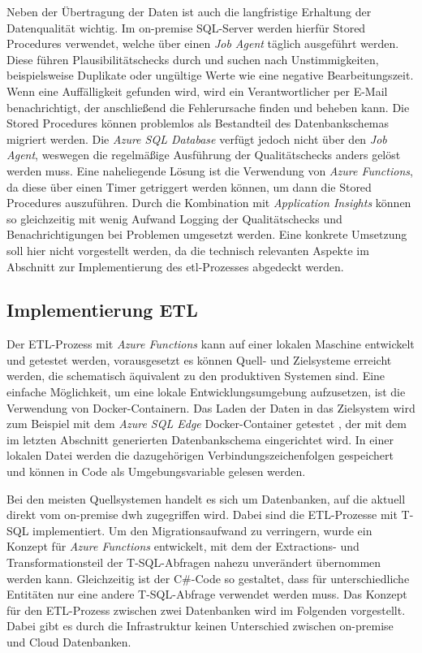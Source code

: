 Neben der Übertragung der Daten ist auch die langfristige Erhaltung der Datenqualität wichtig. Im on-premise SQL-Server werden hierfür Stored Procedures verwendet, welche über einen \textit{Job Agent} täglich ausgeführt werden. Diese führen Plausibilitätschecks durch und suchen nach Unstimmigkeiten, beispielsweise Duplikate oder ungültige Werte wie eine negative Bearbeitungszeit. Wenn eine Auffälligkeit gefunden wird, wird ein Verantwortlicher per E-Mail benachrichtigt, der anschließend die Fehlerursache finden und beheben kann. Die Stored Procedures können problemlos als Bestandteil des Datenbankschemas migriert werden. Die \textit{Azure SQL Database} verfügt jedoch nicht über den \textit{Job Agent}, weswegen die regelmäßige Ausführung der Qualitätschecks anders gelöst werden muss. Eine naheliegende Lösung ist die Verwendung von \textit{Azure Functions}, da diese über einen Timer getriggert werden können, um dann die Stored Procedures auszuführen. Durch die Kombination mit \textit{Application Insights} können so gleichzeitig mit wenig Aufwand Logging der Qualitätschecks und Benachrichtigungen bei Problemen umgesetzt werden. Eine konkrete Umsetzung soll hier nicht vorgestellt werden, da die technisch relevanten Aspekte im Abschnitt zur Implementierung des \ac{etl}-Prozesses abgedeckt werden.

\subsection{Implementierung ETL}
Der ETL-Prozess mit \textit{Azure Functions} kann auf einer lokalen Maschine entwickelt und getestet werden, vorausgesetzt es können Quell- und Zielsysteme erreicht werden, die schematisch äquivalent zu den produktiven Systemen sind. Eine einfache Möglichkeit, um eine lokale Entwicklungsumgebung aufzusetzen, ist die Verwendung von Docker-Containern. Das Laden der Daten in das Zielsystem wird zum Beispiel mit dem \textit{Azure SQL Edge} Docker-Container getestet \cite[vgl.][]{msdoc_22_sql_docker}, der mit dem im letzten Abschnitt generierten Datenbankschema eingerichtet wird. In einer lokalen Datei werden die dazugehörigen Verbindungszeichenfolgen gespeichert und können in Code als Umgebungsvariable gelesen werden.

Bei den meisten Quellsystemen handelt es sich um Datenbanken, auf die aktuell direkt vom on-premise \ac{dwh} zugegriffen wird. Dabei sind die ETL-Prozesse mit T-SQL implementiert. Um den Migrationsaufwand zu verringern, wurde ein Konzept für \textit{Azure Functions} entwickelt, mit dem der Extractions- und Transformationsteil der T-SQL-Abfragen nahezu unverändert übernommen werden kann. Gleichzeitig ist der C\#-Code so gestaltet, dass für unterschiedliche Entitäten nur eine andere T-SQL-Abfrage verwendet werden muss. Das Konzept für den ETL-Prozess zwischen zwei Datenbanken wird im Folgenden vorgestellt. Dabei gibt es durch die Infrastruktur keinen Unterschied zwischen on-premise und Cloud Datenbanken. 

